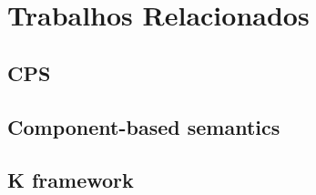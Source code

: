 \chapter{Trabalhos Relacionados}\label{cap5}
\section{CPS}
\section{Component-based semantics}
\section{K framework}